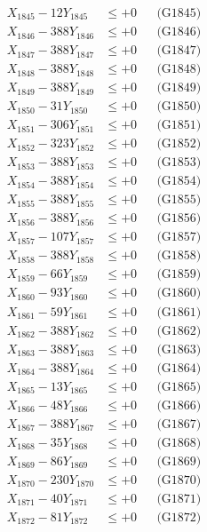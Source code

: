 \documentclass[a4paper,10pt]{article}
\begin{document}
{\begin{align}
X_{1845} - 12Y_{1845} &\leq +0 && \text{(G1845)} \\
X_{1846} - 388Y_{1846} &\leq +0 && \text{(G1846)} \\
X_{1847} - 388Y_{1847} &\leq +0 && \text{(G1847)} \\
X_{1848} - 388Y_{1848} &\leq +0 && \text{(G1848)} \\
X_{1849} - 388Y_{1849} &\leq +0 && \text{(G1849)} \\
X_{1850} - 31Y_{1850} &\leq +0 && \text{(G1850)} \\
\allowbreak
X_{1851} - 306Y_{1851} &\leq +0 && \text{(G1851)} \\
X_{1852} - 323Y_{1852} &\leq +0 && \text{(G1852)} \\
X_{1853} - 388Y_{1853} &\leq +0 && \text{(G1853)} \\
X_{1854} - 388Y_{1854} &\leq +0 && \text{(G1854)} \\
X_{1855} - 388Y_{1855} &\leq +0 && \text{(G1855)} \\
X_{1856} - 388Y_{1856} &\leq +0 && \text{(G1856)} \\
X_{1857} - 107Y_{1857} &\leq +0 && \text{(G1857)} \\
X_{1858} - 388Y_{1858} &\leq +0 && \text{(G1858)} \\
X_{1859} - 66Y_{1859} &\leq +0 && \text{(G1859)} \\
X_{1860} - 93Y_{1860} &\leq +0 && \text{(G1860)} \\
\allowbreak
X_{1861} - 59Y_{1861} &\leq +0 && \text{(G1861)} \\
X_{1862} - 388Y_{1862} &\leq +0 && \text{(G1862)} \\
X_{1863} - 388Y_{1863} &\leq +0 && \text{(G1863)} \\
X_{1864} - 388Y_{1864} &\leq +0 && \text{(G1864)} \\
X_{1865} - 13Y_{1865} &\leq +0 && \text{(G1865)} \\
X_{1866} - 48Y_{1866} &\leq +0 && \text{(G1866)} \\
X_{1867} - 388Y_{1867} &\leq +0 && \text{(G1867)} \\
X_{1868} - 35Y_{1868} &\leq +0 && \text{(G1868)} \\
X_{1869} - 86Y_{1869} &\leq +0 && \text{(G1869)} \\
X_{1870} - 230Y_{1870} &\leq +0 && \text{(G1870)} \\
\allowbreak
X_{1871} - 40Y_{1871} &\leq +0 && \text{(G1871)} \\
X_{1872} - 81Y_{1872} &\leq +0 && \text{(G1872)} \\

\end{align}}
\end{document}
